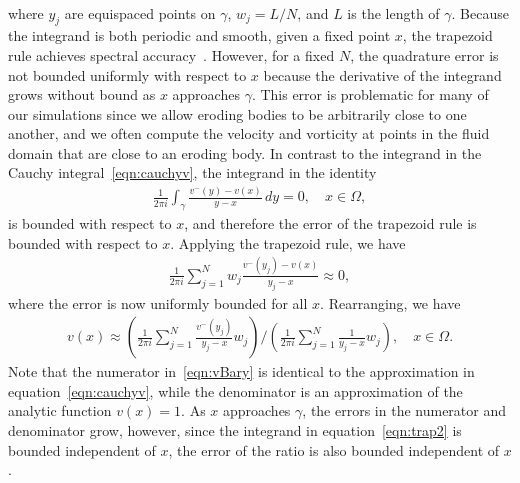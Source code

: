 \documentclass[3p]{elsarticle}
\newcommand{\edit}[1]{{\color{red} #1}}
\begin{document}
\begin{appendices}
{\begin{align}
\end{align}
}
where $y_j$ are equispaced points on $\gamma$, $w_j = L/N$, and $L$ is
the length of $\gamma$. Because the integrand is both periodic and
smooth, given a fixed point $x$, the trapezoid rule achieves spectral
accuracy~\cite{tre-wei2014}. However, for a fixed $N$, the quadrature
error is not bounded uniformly with respect to $x$ because the
derivative of the integrand grows without bound as $x$ approaches
$\gamma$. This error is problematic for many of our simulations since we
allow eroding bodies to be arbitrarily close to one another, and we
often compute the velocity and vorticity at points in the fluid domain
that are close to an eroding body. In contrast to the integrand in the
Cauchy integral~\eqref{eqn:cauchyv}, the integrand in the identity
\begin{align}
  \frac{1}{2\pi i}\int_{\gamma} 
    \frac{v^{-}(y) - v(x)}{y-x} \, dy = 0, \quad x \in \Omega,
  \label{eqn:trap2}
\end{align}
is bounded with respect to $x$, and therefore the error of the trapezoid
rule is bounded with respect to $x$. Applying the trapezoid rule, we
have
\begin{align}
  \frac{1}{2\pi i}\sum_{j=1}^{N} w_{j} 
    \frac{v^{-}(y_j) - v(x)}{y_j - x} \approx 0,
\end{align}
where the error is now uniformly bounded for all $x$. Rearranging, we
have
\begin{align}
  v(x) \approx \left(\frac{1}{2\pi i}\sum_{j=1}^N 
    \frac{v^{-}(y_j)}{y_j - x} w_j \right) \Bigg/
  \left(\frac{1}{2\pi i}\sum_{j=1}^N \frac{1}{y_j - x} w_j \right), 
  \quad x \in \Omega.
  \label{eqn:vBary}
\end{align}
Note that the numerator in~\eqref{eqn:vBary} is identical to \edit{the
approximation in}
equation~\eqref{eqn:cauchyv}, while the denominator is an approximation of
the analytic function $v(x) = 1$. As $x$ approaches $\gamma$, the errors
in the numerator and denominator grow, however, since the integrand in
equation~\eqref{eqn:trap2} is bounded independent of $x$, the error of
the ratio is also bounded independent of $x$.


\end{appendices}
\end{document}

